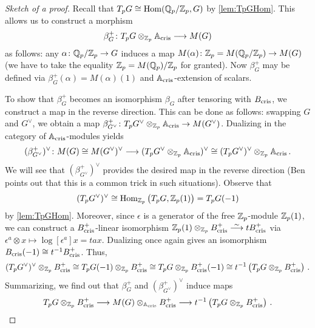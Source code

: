 \documentclass[a4paper, 10pt, oneside, DIV=9, chapterprefix=true, numbers=enddot,bibliography=totoc]{scrbook}
\begin{document}
\begin{proof}[Sketch of a proof]
	Recall that $T_pG\cong \operatorname{Hom}(\mathbb{Q}_p/\mathbb{Z}_p,G)$ by \cref{lem:TpGHom}. This allows us to construct a morphism 
	\begin{equation*}
		\beta_G^+\colon T_pG\otimes_{\IZ_p}\IA_\cris\morphism M(G)
	\end{equation*}
	 as follows: any $\alpha\colon \IQ_p/\IZ_p\morphism G$ induces a map $M(\alpha)\colon \IZ_p= M(\IQ_p/\IZ_p)\morphism M(G)$ (we have to take the equality $\mathbb{Z}_p=M(\mathbb{Q}_p)/\mathbb{Z}_p$ for granted). Now $\beta_G^+$ may be defined via $\beta_G^+(\alpha)=M(\alpha)(1)$ and $\mathbb{A}_{\mathrm{cris}}$-extension of scalars.
	 
	 To show that $\beta_G^+$ becomes an isomorphism $\beta_G$ after tensoring with $B_{\mathrm{cris}}$, we construct a map in the reverse direction. This can be done as follows: swapping $G$ and $G^\vee$, we obtain a map $\beta_{G^\vee}^+\colon T_pG^\vee \otimes_{\IZ_p}\IA_\cris\morphism M(G^\vee)$. Dualizing in the category of $\mathbb{A}_{\mathrm{cris}}$-modules yields
	 \begin{equation*}
	 	(\beta_{G^\vee}^+)^\vee\colon M(G)\cong M(G^\vee)^\vee\morphism (T_pG^\vee\otimes_{\IZ_p}\IA_\cris)^\vee\cong (T_pG^\vee)^\vee\otimes_{\IZ_p}\IA_\cris\,.
	 \end{equation*}
	 We will see that $(\beta_{G^\vee}^+)^\vee$ provides the desired map in the reverse direction (Ben points out that this is a common trick in such situations). Observe that 
	 \begin{equation*}
	 	(T_pG^\vee)^\vee\cong \operatorname{Hom}_{\mathbb{Z}_p}\big(T_pG,\mathbb{Z}_p(1)\big)=T_pG(-1)
	 \end{equation*}
	 by \cref{lem:TpGHom}. Moreover, since $\epsilon$ is a generator of the free $\mathbb{Z}_p$-module $\mathbb{Z}_p(1)$, we can construct a $B_{\mathrm{cris}}^+$-linear isomorphism $\IZ_p(1)\otimes_{\IZ_p}B_\cris^+\isomorphism tB_\cris^+$ via $\epsilon^a\otimes x\mapsto \log{[\epsilon^a]}x=tax$. Dualizing once again gives an isomorphism $B_{\mathrm{cris}}(-1)\cong t^{-1}B_{\mathrm{cris}}^+$. Thus,
	 \begin{equation*}
	 	(T_pG^\vee)^\vee\otimes_{\mathbb{Z}_p}B_{\mathrm{cris}}^+\cong T_pG(-1)\otimes_{\mathbb{Z}_p}B_{\mathrm{cris}}^+\cong T_pG\otimes_{\mathbb{Z}_p}B_{\mathrm{cris}}^+(-1)\cong t^{-1}\left(T_pG\otimes_{\mathbb{Z}_p}B_{\mathrm{cris}}^+\right)\,.
	 \end{equation*}
	 Summarizing, we find out that $\beta_G^+$ and $(\beta_{G^\vee}^+)^\vee$ induce maps
	 \begin{equation*}
	 	T_pG\otimes_{\IZ_p}B_\cris^+\morphism M(G)\otimes_{\IA_\cris}B_\cris^+\morphism t^{-1}\left(T_pG\otimes_{\IZ_p}B_\cris^+\right)\,.

\end{equation*}
\end{proof}
\end{document}
